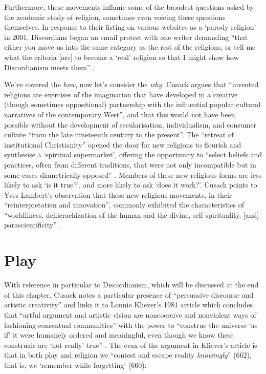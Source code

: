 \documentclass[Draft.tex]{subfiles}
\begin{document}
Furthermore, these movements inflame some of
the broadest questions asked by the academic study of religion,
sometimes even voicing these questions themselves.
In response to their listing on various websites as a `parody religion'
in 2001, Discordians began an email protest with one writer demanding
``that either you move us into the same category
as the rest of the religions, or tell me what the criteria [are]
to become a `real' religion so that I might show
how Discordianism meets them'' \parencite[209]{Chidester05}.

We've covered the \textit{how}, now let's consider the \textit{why}.
Cusack \parencite*[7]{Cusack10} argues that ``invented religions are
exercises of the imagination that have developed in a creative
(though sometimes oppositional) partnership with the influential
popular cultural narratives of the contemporary West'',
and that this would not have been possible without
the development of secularisation, individualism, and consumer culture
``from the late nineteenth century to the present''.
The ``retreat of institutional Christianity'' opened the door
for new religions to flourish and synthesise a `spiritual supermarket',
offering the opportunity to ``select beliefs and practices,
often from different traditions, that were not only incompatible
but in some cases diametrically opposed'' \parencite[25, 17]{Cusack10}.
Members of these new religious forms are less likely to ask
`is it true?', and more likely to ask `does it work?'.
Cusack \parencite[9]{Cusack10} points to Yves Lambert's observation that
these new religious movements, in their ``reinterpretation and innovation'',
commonly exhibited the characteristics of
``worldliness, dehierachization of the human and the divine,
self-spirituality, [and] parascientificity'' \parencite[303]{Lambert99}.


\section*{Play}
With reference in particular to Discordianism,
which will be discussed at the end of this chapter,
Cusack \parencite*[23]{Cusack10} notes a particular presence of
``persuasive discourse and artistic creativity'' and links it to
Lonnie Kliever's 1981 article which concludes that
``artful argument and artistic vision are noncoercive and nonviolent ways
of fashioning consentual communities'' with the power to
``construe the universe `as if' it were humanely ordered and meaningful,
even though we know these construals are
`not really' true'' \parencite[665]{Kliever81}.
The crux of the argument in Kliever's article is that
in both play and religion we
``contest and escape reality \textit{knowingly}'' (662),
that is, we `remember while forgetting' (660).
\end{document}
